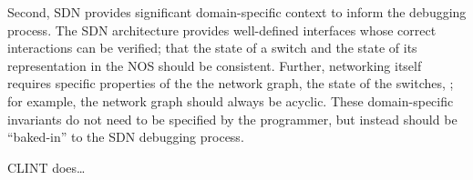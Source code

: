 	Second, SDN provides significant domain-specific context to inform the debugging process.
	The  SDN architecture provides well-defined interfaces whose correct interactions can be verified; \eg{} that the state of a switch and the state of its representation in the NOS should be consistent.
	Further, networking itself requires specific properties of the the network graph, the state of the switches, \etc{}; for example, the network graph should always be acyclic.
	These domain-specific invariants do not need to be specified by the programmer, but instead should be ``baked-in'' to the SDN debugging process.

        CLINT does\ldots


